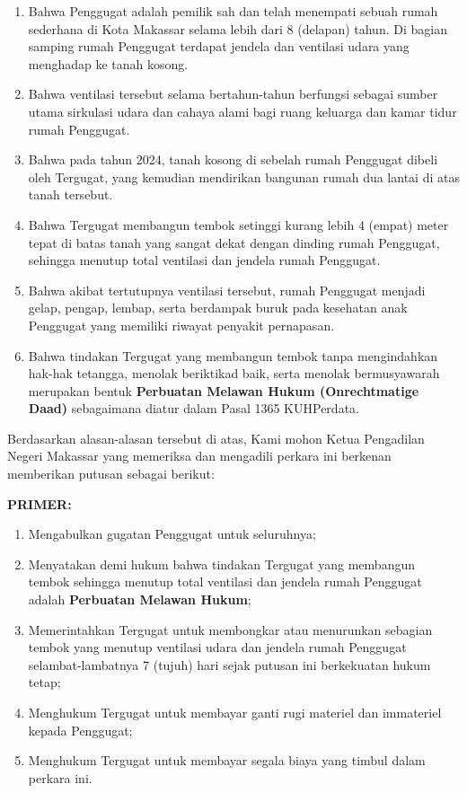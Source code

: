 \documentclass[12pt,a4paper]{article}
\begin{document}
\begin{enumerate}
    \item Bahwa Penggugat adalah pemilik sah dan telah menempati sebuah rumah sederhana di Kota Makassar selama lebih dari 8 (delapan) tahun. Di bagian samping rumah Penggugat terdapat jendela dan ventilasi udara yang menghadap ke tanah kosong.
    \item Bahwa ventilasi tersebut selama bertahun-tahun berfungsi sebagai sumber utama sirkulasi udara dan cahaya alami bagi ruang keluarga dan kamar tidur rumah Penggugat.
    \item Bahwa pada tahun 2024, tanah kosong di sebelah rumah Penggugat dibeli oleh Tergugat, yang kemudian mendirikan bangunan rumah dua lantai di atas tanah tersebut.
    \item Bahwa Tergugat membangun tembok setinggi kurang lebih 4 (empat) meter tepat di batas tanah yang sangat dekat dengan dinding rumah Penggugat, sehingga menutup total ventilasi dan jendela rumah Penggugat.
    \item Bahwa akibat tertutupnya ventilasi tersebut, rumah Penggugat menjadi gelap, pengap, lembap, serta berdampak buruk pada kesehatan anak Penggugat yang memiliki riwayat penyakit pernapasan.
    \item Bahwa tindakan Tergugat yang membangun tembok tanpa mengindahkan hak-hak tetangga, menolak beriktikad baik, serta menolak bermusyawarah merupakan bentuk \textbf{Perbuatan Melawan Hukum (Onrechtmatige Daad)} sebagaimana diatur dalam Pasal 1365 KUHPerdata.
\end{enumerate}

Berdasarkan alasan-alasan tersebut di atas, Kami mohon Ketua Pengadilan Negeri Makassar yang memeriksa dan mengadili perkara ini berkenan memberikan putusan sebagai berikut:

\textbf{PRIMER:}
\begin{enumerate}
    \item Mengabulkan gugatan Penggugat untuk seluruhnya;
    \item Menyatakan demi hukum bahwa tindakan Tergugat yang membangun tembok sehingga menutup total ventilasi dan jendela rumah Penggugat adalah \textbf{Perbuatan Melawan Hukum};
    \item Memerintahkan Tergugat untuk membongkar atau menurunkan sebagian tembok yang menutup ventilasi udara dan jendela rumah Penggugat selambat-lambatnya 7 (tujuh) hari sejak putusan ini berkekuatan hukum tetap;
    \item Menghukum Tergugat untuk membayar ganti rugi materiel dan immateriel kepada Penggugat;
    \item Menghukum Tergugat untuk membayar segala biaya yang timbul dalam perkara ini.
\end{enumerate}
\end{document}
